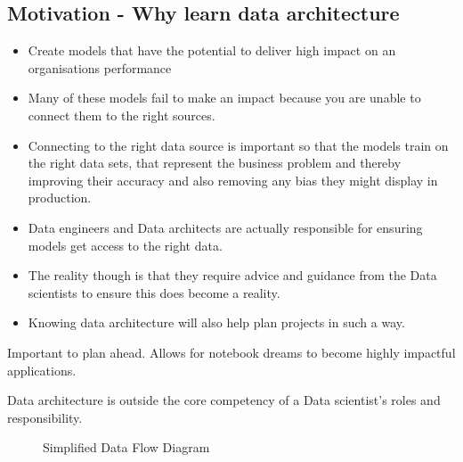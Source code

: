 \subsection{Motivation - Why learn data architecture}
\begin{itemize}
    \item Create models that have the potential to deliver high impact on an organisations performance
    \item Many of these models fail to make an impact because you are unable to connect them to the right sources.
    \item Connecting to the right data source is important so that the models train on the right data sets, that represent the business problem and thereby improving their accuracy and also removing any bias they might display in production.
    \item Data engineers and Data architects are actually responsible for ensuring models get access to the right data.
    \item The reality though is that they require advice and guidance from the Data scientists to ensure this does become a reality.
    \item Knowing data architecture will also help plan projects in such a way.
\end{itemize}
Important to plan ahead.
Allows for notebook dreams to become highly impactful applications.

\begin{note}
    Data architecture is outside the core competency of a Data scientist’s roles and responsibility.
\end{note}

\begin{figure}[ht]
    \centering
    \caption{Simplified Data Flow Diagram}
    \label{fig:dataflow}
\end{figure}


